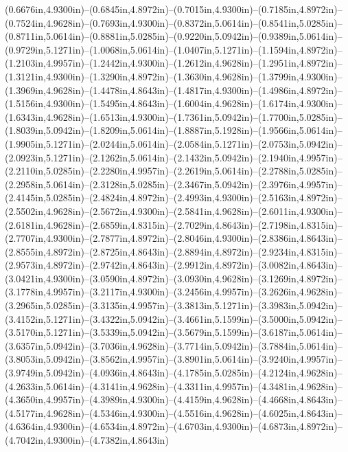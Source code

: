 (0.6676in,4.9300in)--(0.6845in,4.8972in)--(0.7015in,4.9300in)--(0.7185in,4.8972in)--(0.7524in,4.9628in)--(0.7693in,4.9300in)--(0.8372in,5.0614in)--(0.8541in,5.0285in)--(0.8711in,5.0614in)--(0.8881in,5.0285in)--(0.9220in,5.0942in)--(0.9389in,5.0614in)--(0.9729in,5.1271in)--(1.0068in,5.0614in)--(1.0407in,5.1271in)--(1.1594in,4.8972in)--(1.2103in,4.9957in)--(1.2442in,4.9300in)--(1.2612in,4.9628in)--(1.2951in,4.8972in)--(1.3121in,4.9300in)--(1.3290in,4.8972in)--(1.3630in,4.9628in)--(1.3799in,4.9300in)--(1.3969in,4.9628in)--(1.4478in,4.8643in)--(1.4817in,4.9300in)--(1.4986in,4.8972in)--(1.5156in,4.9300in)--(1.5495in,4.8643in)--(1.6004in,4.9628in)--(1.6174in,4.9300in)--(1.6343in,4.9628in)--(1.6513in,4.9300in)--(1.7361in,5.0942in)--(1.7700in,5.0285in)--(1.8039in,5.0942in)--(1.8209in,5.0614in)--(1.8887in,5.1928in)--(1.9566in,5.0614in)--(1.9905in,5.1271in)--(2.0244in,5.0614in)--(2.0584in,5.1271in)--(2.0753in,5.0942in)--(2.0923in,5.1271in)--(2.1262in,5.0614in)--(2.1432in,5.0942in)--(2.1940in,4.9957in)--(2.2110in,5.0285in)--(2.2280in,4.9957in)--(2.2619in,5.0614in)--(2.2788in,5.0285in)--(2.2958in,5.0614in)--(2.3128in,5.0285in)--(2.3467in,5.0942in)--(2.3976in,4.9957in)--(2.4145in,5.0285in)--(2.4824in,4.8972in)--(2.4993in,4.9300in)--(2.5163in,4.8972in)--(2.5502in,4.9628in)--(2.5672in,4.9300in)--(2.5841in,4.9628in)--(2.6011in,4.9300in)--(2.6181in,4.9628in)--(2.6859in,4.8315in)--(2.7029in,4.8643in)--(2.7198in,4.8315in)--(2.7707in,4.9300in)--(2.7877in,4.8972in)--(2.8046in,4.9300in)--(2.8386in,4.8643in)--(2.8555in,4.8972in)--(2.8725in,4.8643in)--(2.8894in,4.8972in)--(2.9234in,4.8315in)--(2.9573in,4.8972in)--(2.9742in,4.8643in)--(2.9912in,4.8972in)--(3.0082in,4.8643in)--(3.0421in,4.9300in)--(3.0590in,4.8972in)--(3.0930in,4.9628in)--(3.1269in,4.8972in)--(3.1778in,4.9957in)--(3.2117in,4.9300in)--(3.2456in,4.9957in)--(3.2626in,4.9628in)--(3.2965in,5.0285in)--(3.3135in,4.9957in)--(3.3813in,5.1271in)--(3.3983in,5.0942in)--(3.4152in,5.1271in)--(3.4322in,5.0942in)--(3.4661in,5.1599in)--(3.5000in,5.0942in)--(3.5170in,5.1271in)--(3.5339in,5.0942in)--(3.5679in,5.1599in)--(3.6187in,5.0614in)--(3.6357in,5.0942in)--(3.7036in,4.9628in)--(3.7714in,5.0942in)--(3.7884in,5.0614in)--(3.8053in,5.0942in)--(3.8562in,4.9957in)--(3.8901in,5.0614in)--(3.9240in,4.9957in)--(3.9749in,5.0942in)--(4.0936in,4.8643in)--(4.1785in,5.0285in)--(4.2124in,4.9628in)--(4.2633in,5.0614in)--(4.3141in,4.9628in)--(4.3311in,4.9957in)--(4.3481in,4.9628in)--(4.3650in,4.9957in)--(4.3989in,4.9300in)--(4.4159in,4.9628in)--(4.4668in,4.8643in)--(4.5177in,4.9628in)--(4.5346in,4.9300in)--(4.5516in,4.9628in)--(4.6025in,4.8643in)--(4.6364in,4.9300in)--(4.6534in,4.8972in)--(4.6703in,4.9300in)--(4.6873in,4.8972in)--(4.7042in,4.9300in)--(4.7382in,4.8643in)
